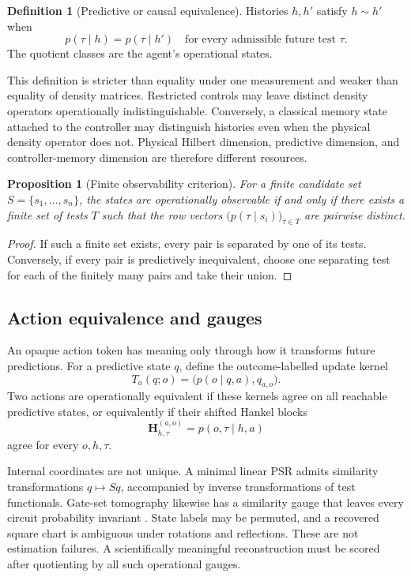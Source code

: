 \documentclass[11pt]{article}
\newtheorem{proposition}[theorem]{Proposition}
\theoremstyle{definition}
\newtheorem{definition}[theorem]{Definition}
\theoremstyle{remark}
\begin{document}
\begin{definition}[Predictive or causal equivalence]
Histories \(h,h'\) satisfy \(h\sim h'\) when
\[
p(\tau\mid h)=p(\tau\mid h')
\quad\text{for every admissible future test }\tau.
\]
The quotient classes are the agent's operational states.
\end{definition}

This definition is stricter than equality under one measurement and weaker
than equality of density matrices. Restricted controls may leave distinct
density operators operationally indistinguishable. Conversely, a classical
memory state attached to the controller may distinguish histories even when
the physical density operator does not. Physical Hilbert dimension,
predictive dimension, and controller-memory dimension are therefore different
resources.

\begin{proposition}[Finite observability criterion]
For a finite candidate set \(S=\{s_1,\ldots,s_n\}\), the states are
operationally observable if and only if there exists a finite set of tests
\(T\) such that the row vectors
\(\bigl(p(\tau\mid s_i)\bigr)_{\tau\in T}\) are pairwise distinct.
\end{proposition}
\begin{proof}
If such a finite set exists, every pair is separated by one of its tests.
Conversely, if every pair is predictively inequivalent, choose one separating
test for each of the finitely many pairs and take their union.
\end{proof}

\subsection{Action equivalence and gauges}

An opaque action token has meaning only through how it transforms future
predictions. For a predictive state \(q\), define the outcome-labelled update
kernel
\[
T_a(q;o)=\bigl(p(o\mid q,a),q_{a,o}\bigr).
\]
Two actions are operationally equivalent if these kernels agree on all
reachable predictive states, or equivalently if their shifted Hankel blocks
\[
\mathbf H^{(a,o)}_{h,\tau}=p(o,\tau\mid h,a)
\]
agree for every \(o,h,\tau\).

Internal coordinates are not unique. A minimal linear PSR admits similarity
transformations \(q\mapsto Sq\), accompanied by inverse transformations of
test functionals. Gate-set tomography likewise has a similarity gauge that
leaves every circuit probability invariant \cite{NielsenGST2020,DiMatteo2020}.
State labels may be permuted, and a recovered square chart is ambiguous under
rotations and reflections. These are not estimation failures. A scientifically
meaningful reconstruction must be scored after quotienting by all such
operational gauges.
\end{document}
